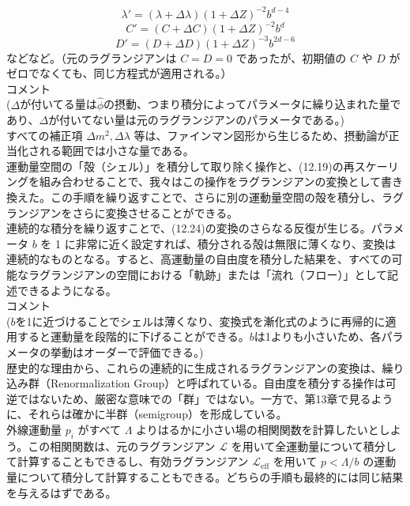 \documentclass[uplatex,dvipdfmx]{jsarticle}
\begin{document}
\begin{equation}
    \lambda' = (\lambda + \Delta \lambda)(1+\Delta Z)^{-2} b^{d-4}
\end{equation}
\begin{equation}
    C' =( C+ \Delta C )(1+\Delta Z)^{-2} b^{d}
\end{equation}
\begin{equation}
    D' = (D + \Delta D)(1+\Delta Z)^{-3} b^{2d-6}
\end{equation}
などなど。（元のラグランジアンは $C=D=0$ であったが、初期値の $C$ や $D$ がゼロでなくても、同じ方程式が適用される。）\\
コメント\\
($\Delta$が付いてる量は$\hat{\phi}$の摂動、つまり積分によってパラメータに繰り込まれた量であり、$\Delta$が付いてない量は元のラグランジアンのパラメータである。)\\
すべての補正項 $\Delta m^2, \Delta \lambda$ 等は、ファインマン図形から生じるため、摂動論が正当化される範囲では小さな量である。\\
運動量空間の「殻（シェル）」を積分して取り除く操作と、(12.19)の再スケーリングを組み合わせることで、我々はこの操作をラグランジアンの変換として書き換えた。この手順を繰り返すことで、さらに別の運動量空間の殻を積分し、ラグランジアンをさらに変換させることができる。\\
連続的な積分を繰り返すことで、(12.24)の変換のさらなる反復が生じる。パラメータ $b$ を 1 に非常に近く設定すれば、積分される殻は無限に薄くなり、変換は連続的なものとなる。すると、高運動量の自由度を積分した結果を、すべての可能なラグランジアンの空間における「軌跡」または「流れ（フロー）」として記述できるようになる。\\
コメント\\
($b$を1に近づけることでシェルは薄くなり、変換式を漸化式のように再帰的に適用すると運動量を段階的に下げることができる。$b$は1よりも小さいため、各パラメータの挙動はオーダーで評価できる。)\\
歴史的な理由から、これらの連続的に生成されるラグランジアンの変換は、繰り込み群（Renormalization Group）と呼ばれている。自由度を積分する操作は可逆ではないため、厳密な意味での「群」ではない。一方で、第13章で見るように、それらは確かに半群（semigroup）を形成している。\\
外線運動量 $p_i$ がすべて $\Lambda$ よりはるかに小さい場の相関関数を計算したいとしよう。この相関関数は、元のラグランジアン $\mathcal{L}$ を用いて全運動量について積分して計算することもできるし、有効ラグランジアン $\mathcal{L}_{\text{eff}}$ を用いて $p < \Lambda/b$ の運動量について積分して計算することもできる。どちらの手順も最終的には同じ結果を与えるはずである。\\
\end{document}
